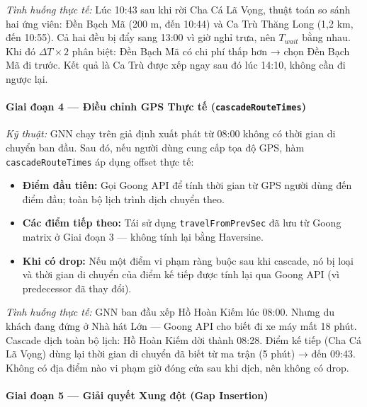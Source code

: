 \documentclass[12pt,a4paper]{article}
\begin{document}
\medskip
\textit{Tình huống thực tế:} Lúc 10:43 sau khi rời Cha Cá Lã Vọng, thuật toán
so sánh hai ứng viên: Đền Bạch Mã (200 m, đến 10:44) và Ca Trù Thăng Long
(1,2 km, đến 10:55). Cả hai đều bị đẩy sang 13:00 vì giờ nghỉ trưa, nên
$T_{wait}$ bằng nhau. Khi đó $\Delta T \times 2$ phân biệt: Đền Bạch Mã có chi
phí thấp hơn → chọn Đền Bạch Mã đi trước. Kết quả là Ca Trù được xếp ngay
sau đó lúc 14:10, không cần đi ngược lại.

\paragraph{Giai đoạn 4 --- Điều chỉnh GPS Thực tế (\texttt{cascadeRouteTimes})}

\textit{Kỹ thuật:} GNN chạy trên giả định xuất phát từ 08:00 không có thời gian
di chuyển ban đầu. Sau đó, nếu người dùng cung cấp tọa độ GPS, hàm
\texttt{cascadeRouteTimes} áp dụng offset thực tế:
\begin{itemize}
  \item \textbf{Điểm đầu tiên:} Gọi Goong API để tính thời gian từ GPS người
        dùng đến điểm đầu; toàn bộ lịch trình dịch chuyển theo.
  \item \textbf{Các điểm tiếp theo:} Tái sử dụng \texttt{travelFromPrevSec} đã
        lưu từ Goong matrix ở Giai đoạn 3 --- không tính lại bằng Haversine.
  \item \textbf{Khi có drop:} Nếu một điểm vi phạm ràng buộc sau khi cascade,
        nó bị loại và thời gian di chuyển của điểm kế tiếp được tính lại qua
        Goong API (vì predecessor đã thay đổi).
\end{itemize}

\medskip
\textit{Tình huống thực tế:} GNN ban đầu xếp Hồ Hoàn Kiếm lúc 08:00. Nhưng
du khách đang đứng ở Nhà hát Lớn --- Goong API cho biết đi xe máy mất 18 phút.
Cascade dịch toàn bộ lịch: Hồ Hoàn Kiếm dời thành 08:28. Điểm kế tiếp (Cha Cá
Lã Vọng) dùng lại thời gian di chuyển đã biết từ ma trận (5 phút) → đến 09:43.
Không có địa điểm nào vi phạm giờ đóng cửa sau khi dịch, nên không có drop.

\paragraph{Giai đoạn 5 --- Giải quyết Xung đột (Gap Insertion)}
\end{document}
